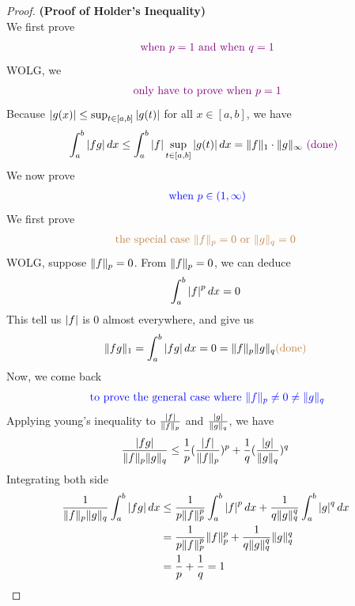 \documentclass{report}
\begin{document}
\begin{proof}
\textbf{(Proof of Holder's Inequality)}\\

We first prove 
\begin{align*}
\textcolor{violet}{\text{ when }p=1\text{ and when }q=1}
\end{align*}
WOLG, we 
\begin{align*}
\textcolor{violet}{\text{ only have to prove when }p=1}
\end{align*}
Because $\left|g(x)\right|\leq \sup_{t\in [a,b]}\left|g(t)\right|$ for all $x\in [a,b]$, we have
\begin{align*}
\int_a^b \left|fg\right|dx\leq \int_a^b \left|f\right|\sup_{t\in [a,b]}\left|g(t)\right|dx=\| f \|_1 \cdot \| g \|_{\infty}\textcolor{violet}{\text{ (done) }}
\end{align*}
We now prove 
\begin{align*}
\textcolor{blue}{\text{ when }p\in  (1,\infty)}
\end{align*}
We first prove 
\begin{align*}
  \textcolor{brown}{\text{ the special case $\| f \|_p=0\text{ or }\| g \|_q=0$ }}
\end{align*}
WOLG, suppose $\| f \|_p=0$. From $\| f \|_p=0$, we can deduce
\begin{align*}
\int_a^b \left|f\right|^p dx=0
\end{align*}
This tell us $\left|f\right|$ is $0$ almost everywhere, and give us 
\begin{align*}
\| fg \|_1=\int_a^b \left|fg\right|dx=0=\| f \|_p\| g \|_q\textcolor{brown}{\text{(done)}}
\end{align*}
Now, we come back 
\begin{align*}
\textcolor{blue}{\text{ to prove the general case where $\| f \|_p\neq 0\neq \| g \|_q$}}
\end{align*}
Applying young's inequality to $\frac{\left|f\right|}{\| f \|_p}$ and $\frac{\left|g\right|}{\| g \|_q}$, we have 
\begin{align*}
\frac{\left|fg\right|}{\| f \|_p\| g \|_q}\leq \frac{1}{p}(\frac{\left|f\right|}{\| f \|_p})^p+\frac{1}{q}(\frac{\left|g\right|}{\| g \|_q})^q
\end{align*}
Integrating both side 
\begin{align*} \frac{1}{\| f \|_p\| g \|_q} \int_a^b \left|fg\right|dx&\leq \frac{1}{p\| f \|_p^p}\int_a^b \left|f\right|^pdx + \frac{1}{q\| g \|_q^q} \int_a^b \left|g\right|^qdx \\
  &=\frac{1}{p\| f \|_p^p}\| f \|_p^p+\frac{1}{q\| g \|_q^q}\| g \|_q^q\\
  &=\frac{1}{p}+\frac{1}{q}=1
\end{align*}

\end{proof}
\end{document}
